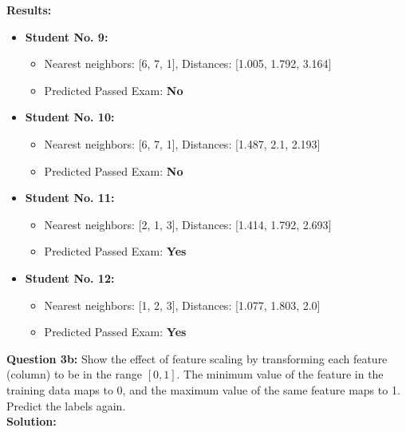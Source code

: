 \documentclass[a4paper,12pt]{article}
\begin{document}
\textbf{Results:}
\begin{itemize}
    \item \textbf{Student No. 9:}
    \begin{itemize}
        \item Nearest neighbors: [6, 7, 1], Distances: [1.005, 1.792, 3.164]
        \item Predicted Passed Exam: \textbf{No}
    \end{itemize}
    \item \textbf{Student No. 10:}
    \begin{itemize}
        \item Nearest neighbors: [6, 7, 1], Distances: [1.487, 2.1, 2.193]
        \item Predicted Passed Exam: \textbf{No}
    \end{itemize}
    \item \textbf{Student No. 11:}
    \begin{itemize}
        \item Nearest neighbors: [2, 1, 3], Distances: [1.414, 1.792, 2.693]
        \item Predicted Passed Exam: \textbf{Yes}
    \end{itemize}
    \item \textbf{Student No. 12:}
    \begin{itemize}
        \item Nearest neighbors: [1, 2, 3], Distances: [1.077, 1.803, 2.0]
        \item Predicted Passed Exam: \textbf{Yes}
    \end{itemize}
\end{itemize}
\newpage
\textbf{Question 3b:} Show the effect of feature scaling by transforming each feature (column) to be in the range \([0,1]\). The minimum value of the feature in the training data maps to 0, and the maximum value of the same feature maps to 1. Predict the labels again.\\
\textbf{Solution:}
\end{document}
